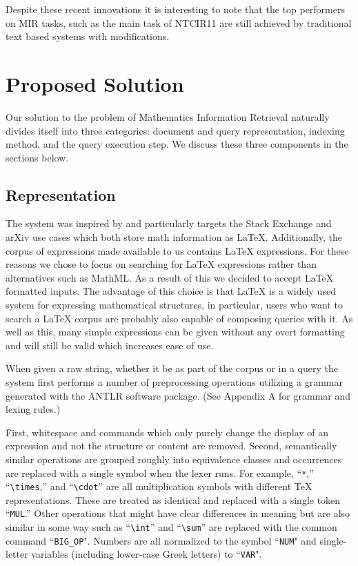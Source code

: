 \documentclass{sig-alternate}
\begin{document}
Despite these recent innovations it is interesting to note that the top performers on 
MIR tasks, such as the main task of NTCIR11 are still achieved by traditional text based
systems with modifications.

\section{Proposed Solution}
Our solution to the problem of Mathematics Information Retrieval naturally divides itself into three categories: document and query representation, indexing method, and the query execution step.  We discuss these three components in the sections below.

\subsection{Representation}
The system was inspired by and particularly targets the Stack Exchange
and arXiv use cases which both store math information as \LaTeX{}. 
Additionally, the corpus of expressions made available to us contains
\LaTeX{} expressions. For these reasons we chose to focus on searching
for \LaTeX{} expressions rather than alternatives such as MathML. As a 
result of this we decided to accept \LaTeX{} formatted inputs. The advantage
of this choice is that \LaTeX{} is a widely used system for expressing
mathematical structures, in particular, users who want to search
a \LaTeX{} corpus are probably also capable of composing queries with it.
As well as this, many simple expressions can be given without any 
overt formatting and will still be valid which increases ease of use.

When given a raw string, whether it be as part of the corpus or in 
a query the system first performs a number of preprocessing operations utilizing a grammar
generated with the ANTLR software package.  (See Appendix A for 
grammar and lexing rules.)

First, whitespace and commands which only purely change the display of an
expression and not the structure or content are removed. Second, 
semantically similar operations are grouped roughly into equivalence 
classes and occurrences are replaced with a single symbol when the lexer runs.
For example, ``\texttt{*},'' ``\texttt{\textbackslash times},'' and ``\texttt{\textbackslash cdot}'' are all multiplication symbols with different \TeX{} representations.  These are treated as identical and replaced with a single token ``\texttt{MUL}.'' Other operations that might have clear differences in meaning but are also
similar in some way such as ``\texttt{\textbackslash int}'' and ``\texttt{\textbackslash sum}'' are replaced with the common command ``\texttt{BIG\_OP}". Numbers are all normalized to the symbol ``\texttt{NUM}" and single-letter variables (including lower-case Greek letters) to ``\texttt{VAR}".
\end{document}

